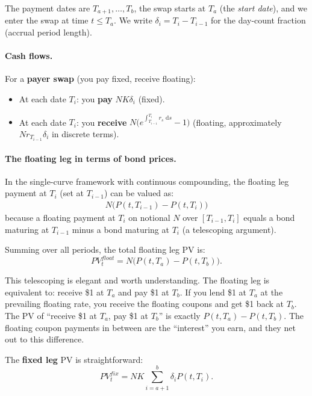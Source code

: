 \documentclass[11pt]{article}
\newcommand{\dd}{\,\mathrm{d}}
\begin{document}
The payment dates are $T_{a+1},\ldots,T_b$, the swap starts at $T_a$
(the \emph{start date}), and we enter the swap at time $t \le T_a$.  We
write $\delta_i = T_i - T_{i-1}$ for the day-count fraction (accrual
period length).

\paragraph{Cash flows.}

For a \textbf{payer swap} (you pay fixed, receive floating):
\begin{itemize}
  \item At each date $T_i$: you \textbf{pay} $N K\delta_i$ (fixed).
  \item At each date $T_i$: you \textbf{receive} $N\big(e^{\int_{T_{i-1}}^{T_i}r_s\,\dd s}-1\big)$
  (floating, approximately $N r_{T_{i-1}}\delta_i$ in discrete terms).
\end{itemize}

\paragraph{The floating leg in terms of bond prices.}  In the
single-curve framework with continuous compounding, the floating leg
payment at $T_i$ (set at $T_{i-1}$) can be valued as:
\begin{align*}
N\big(P(t,T_{i-1}) - P(t,T_i)\big)
\end{align*}
because a floating payment at $T_i$ on notional $N$ over $[T_{i-1},T_i]$
equals a bond maturing at $T_{i-1}$ minus a bond maturing at $T_i$ (a
telescoping argument).

Summing over all periods, the total floating leg PV is:
\[
PV^{float}_t = N\big(P(t,T_a) - P(t,T_b)\big).
\]

\begin{intuition}
This telescoping is elegant and worth understanding.  The floating leg is
equivalent to: receive \$1 at $T_a$ and pay \$1 at $T_b$.  If you lend
\$1 at $T_a$ at the prevailing floating rate, you receive the floating
coupons and get \$1 back at $T_b$.  The PV of ``receive \$1 at $T_a$, pay
\$1 at $T_b$'' is exactly $P(t,T_a) - P(t,T_b)$.  The floating coupon
payments in between are the ``interest'' you earn, and they net out to this
difference.
\end{intuition}

The \textbf{fixed leg} PV is straightforward:
\[
PV^{fix}_t = NK\sum_{i=a+1}^{b}\delta_i P(t,T_i).
\]
\end{document}
